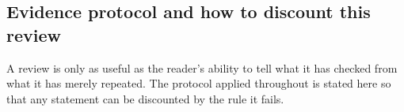 
\subsection{Evidence protocol and how to discount this review}\label{sec:evidence_protocol}

A review is only as useful as the reader's ability to tell what it has checked from what it has merely
repeated. The protocol applied throughout is stated here so that any statement can be discounted by the
rule it fails.

